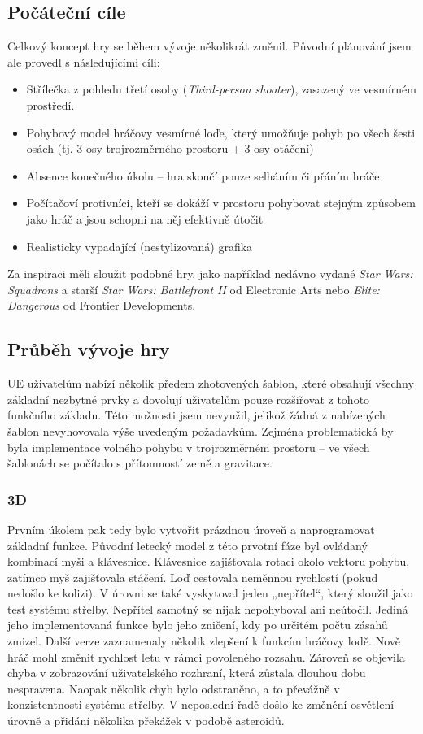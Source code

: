 \documentclass[12pt,a4paper,hidelinks]{article}
\begin{document}
\subsection{Počáteční cíle}
Celkový koncept hry se během vývoje několikrát změnil. Původní plánování jsem ale provedl s následujícími cíli:
\begin{itemize}
	\item Střílečka z pohledu třetí osoby (\textit{Third-person shooter}), zasazený ve vesmírném prostředí.
	\item Pohybový model hráčovy vesmírné loďe, který umožňuje pohyb po všech šesti osách (tj. 3 osy trojrozměrného prostoru + 3 osy otáčení)
	\item Absence konečného úkolu – hra skončí pouze selháním či přáním hráče
	\item Počítačoví protivníci, kteří se dokáží v prostoru pohybovat stejným způsobem jako hráč a jsou schopni na něj efektivně útočit
	\item Realisticky vypadající (nestylizovaná) grafika
\end{itemize}

Za inspiraci měli sloužit podobné hry, jako například nedávno vydané \textit{Star Wars: Squadrons} a starší \textit{Star Wars: Battlefront II} od Electronic Arts nebo \textit{Elite: Dangerous} od Frontier Developments.\\

\subsection{Průběh vývoje hry}
UE uživatelům nabízí několik předem zhotovených šablon, které obsahují všechny základní nezbytné prvky a dovolují uživatelům pouze rozšiřovat z tohoto funkčního základu. Této možnosti jsem nevyužil, jelikož žádná z nabízených šablon nevyhovovala výše uvedeným požadavkům. Zejména problematická by byla implementace volného pohybu v trojrozměrném prostoru – ve všech šablonách se počítalo s přítomností země a gravitace.
\subsubsection{3D}
Prvním úkolem pak tedy bylo vytvořit prázdnou úroveň a naprogramovat základní funkce. Původní letecký model z této prvotní fáze byl ovládaný kombinací myši a klávesnice. Klávesnice zajišťovala rotaci okolo vektoru pohybu, zatímco myš zajišťovala stáčení. Loď cestovala neměnnou rychlostí (pokud nedošlo ke kolizi). V úrovni se také vyskytoval jeden „nepřítel“, který sloužil jako test systému střelby. Nepřítel samotný se nijak nepohyboval ani neútočil. Jediná jeho implementovaná funkce bylo jeho zničení, kdy po určitém počtu zásahů zmizel.
Další verze zaznamenaly několik zlepšení k funkcím hráčovy lodě. Nově hráč mohl změnit rychlost letu v rámci povoleného rozsahu. Zároveň se objevila chyba v zobrazování uživatelského rozhraní, která zůstala dlouhou dobu nespravena. Naopak několik chyb bylo odstraněno, a to převážně v konzistentnosti systému střelby. V neposlední řadě došlo ke změnění osvětlení úrovně a přidání několika překážek v podobě asteroidů.
\end{document}
